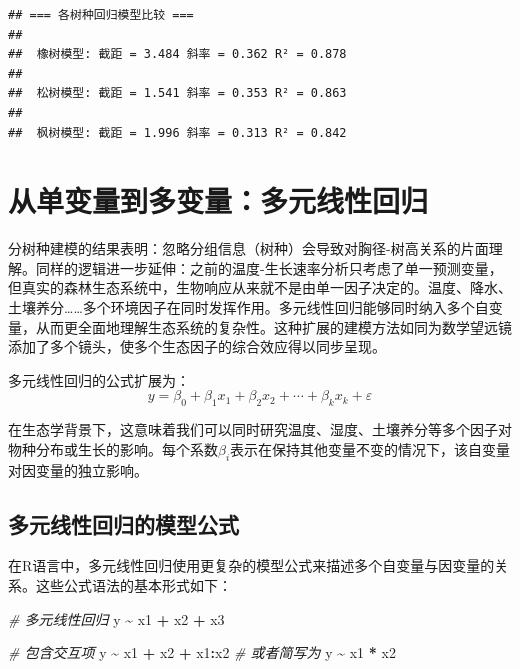 \documentclass[
  twoside,12pt,fontset=none]{ctexbook}
\newenvironment{Shaded}{\begin{snugshade}}{\end{snugshade}}
\newcommand{\CommentTok}[1]{\textcolor[rgb]{0.56,0.35,0.01}{\textit{#1}}}
\newcommand{\NormalTok}[1]{#1}
\newcommand{\SpecialCharTok}[1]{\textcolor[rgb]{0.81,0.36,0.00}{\textbf{#1}}}
\begin{document}
\begin{verbatim}
## === 各树种回归模型比较 ===
## 
##  橡树模型: 截距 = 3.484 斜率 = 0.362 R² = 0.878 
## 
##  松树模型: 截距 = 1.541 斜率 = 0.353 R² = 0.863 
## 
##  枫树模型: 截距 = 1.996 斜率 = 0.313 R² = 0.842
\end{verbatim}

\hypertarget{ux4eceux5355ux53d8ux91cfux5230ux591aux53d8ux91cfux591aux5143ux7ebfux6027ux56deux5f52}{%
\section{从单变量到多变量：多元线性回归}\label{ux4eceux5355ux53d8ux91cfux5230ux591aux53d8ux91cfux591aux5143ux7ebfux6027ux56deux5f52}}

分树种建模的结果表明：忽略分组信息（树种）会导致对胸径-树高关系的片面理解。同样的逻辑进一步延伸：之前的温度-生长速率分析只考虑了单一预测变量，但真实的森林生态系统中，生物响应从来就不是由单一因子决定的。温度、降水、土壤养分\ldots\ldots 多个环境因子在同时发挥作用。多元线性回归能够同时纳入多个自变量，从而更全面地理解生态系统的复杂性。这种扩展的建模方法如同为数学望远镜添加了多个镜头，使多个生态因子的综合效应得以同步呈现。

多元线性回归的公式扩展为：\[y = \beta_0 + \beta_1 x_1 + \beta_2 x_2 + \cdots + \beta_k x_k + \varepsilon\]

在生态学背景下，这意味着我们可以同时研究温度、湿度、土壤养分等多个因子对物种分布或生长的影响。每个系数\(\beta_i\)表示在保持其他变量不变的情况下，该自变量对因变量的独立影响。

\hypertarget{ux591aux5143ux7ebfux6027ux56deux5f52ux7684ux6a21ux578bux516cux5f0f}{%
\subsection{多元线性回归的模型公式}\label{ux591aux5143ux7ebfux6027ux56deux5f52ux7684ux6a21ux578bux516cux5f0f}}

在R语言中，多元线性回归使用更复杂的模型公式来描述多个自变量与因变量的关系。这些公式语法的基本形式如下：

\begin{Shaded}
\begin{Highlighting}[]
\CommentTok{\# 多元线性回归}
\NormalTok{y }\SpecialCharTok{\textasciitilde{}}\NormalTok{ x1 }\SpecialCharTok{+}\NormalTok{ x2 }\SpecialCharTok{+}\NormalTok{ x3}

\CommentTok{\# 包含交互项}
\NormalTok{y }\SpecialCharTok{\textasciitilde{}}\NormalTok{ x1 }\SpecialCharTok{+}\NormalTok{ x2 }\SpecialCharTok{+}\NormalTok{ x1}\SpecialCharTok{:}\NormalTok{x2}
\CommentTok{\# 或者简写为}
\NormalTok{y }\SpecialCharTok{\textasciitilde{}}\NormalTok{ x1 }\SpecialCharTok{*}\NormalTok{ x2}
\end{Highlighting}
\end{Shaded}
\end{document}
